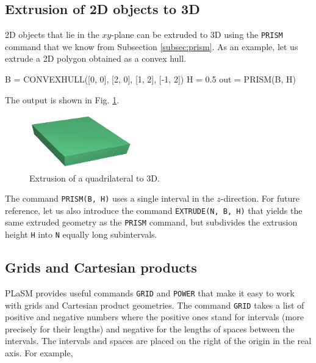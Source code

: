 \subsection{Extrusion of 2D objects to 3D}\label{subsec:extrusion}

2D objects that lie in the $xy$-plane can be extruded to 3D
using the {\tt PRISM} command that we know from Subsection \ref{subsec:prism}. 
As an example, let us extrude a 2D polygon obtained as a convex hull.

\begin{bluecode}
B = CONVEXHULL([0, 0], [2, 0], [1, 2], [-1, 2])
H = 0.5
out = PRISM(B, H)
\end{bluecode}
The output is shown in Fig. \ref{fig:extrusion-3}.\\

\begin{figure}[!ht]
\begin{center}
\includegraphics[width=0.4\textwidth]{img/extrude-3.png}
\end{center}
\vspace{-4mm}
\caption{Extrusion of a quadrilateral to 3D.}
\label{fig:extrusion-3}
\end{figure}
\noindent
The command {\tt PRISM(B, H)} uses a single interval in the $z$-direction. For future
reference, let us also introduce the command {\tt EXTRUDE(N, B, H)} that yields the same
extruded geometry as the {\tt PRISM} command, but subdivides the extrusion height {\tt H}
into {\tt N} equally long subintervals. 

\subsection{Grids and Cartesian products}\label{subsec:grids}

PLaSM provides useful commands {\tt GRID} and {\tt POWER} that 
make it easy to work with grids and Cartesian product geometries. The command
{\tt GRID} takes a list of positive and negative numbers where the 
positive ones stand for intervals (more precisely for their lengths) 
and negative for the lengths of spaces between the intervals. The 
intervals and spaces are placed on the right of the origin in the 
real axis. For example, 

